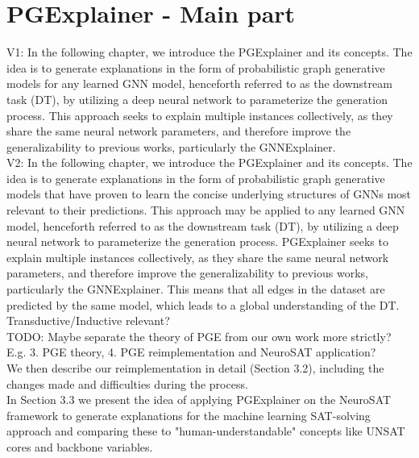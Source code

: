 \chapter{PGExplainer - Main part}
\label{ch:PGExplainer}
V1: In the following chapter, we introduce the PGExplainer\cite{} and its concepts. The idea is to generate explanations in the form of probabilistic graph generative models for any learned GNN model, henceforth referred to as the downstream task (DT), by utilizing a deep neural network to parameterize the generation process. This approach seeks to explain multiple instances collectively, as they share the same neural network parameters, and therefore improve the generalizability to previous works, particularly the GNNExplainer\cite{}. \\

V2: In the following chapter, we introduce the PGExplainer\cite{} and its concepts. The idea is to generate explanations in the form of probabilistic graph generative models that have proven to learn the concise underlying structures of GNNs most relevant to their predictions. This approach may be applied to any learned GNN model, henceforth referred to as the downstream task (DT), by utilizing a deep neural network to parameterize the generation process. PGExplainer seeks to explain multiple instances collectively, as they share the same neural network parameters, and therefore improve the generalizability to previous works, particularly the GNNExplainer\cite{}. This means that all edges in the dataset are predicted by the same model, which leads to a global understanding of the DT. \\

Transductive/Inductive relevant? \\

TODO: Maybe separate the theory of PGE from our own work more strictly? E.g. 3. PGE theory, 4. PGE reimplementation and NeuroSAT application? \\

We then describe our reimplementation in detail (Section 3.2), including the changes made and difficulties during the process. \\

In Section 3.3 we present the idea of applying PGExplainer on the NeuroSAT framework to generate explanations for the machine learning SAT-solving approach and comparing these to "human-understandable" concepts like UNSAT cores and backbone variables. 
